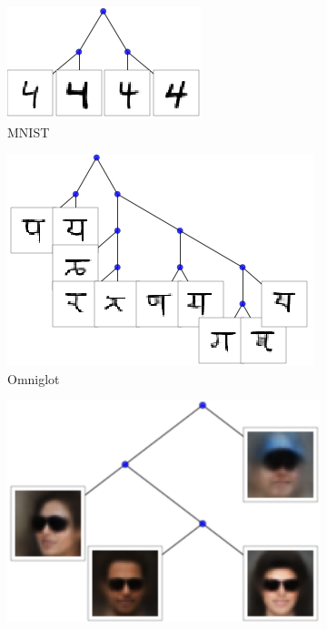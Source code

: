 \begin{figure}[t]
\centering
\begin{subfigure}[t]{0.3\textwidth}
\centering
\includegraphics[width=\textwidth]{img/loracs/mnist/subtree1.png}
\caption{MNIST}
\end{subfigure}
\begin{subfigure}[t]{0.3\textwidth}
\centering
\includegraphics[width=\textwidth]{img/loracs/omniglot/subtree1.png}
\caption{Omniglot}
\end{subfigure}
\begin{subfigure}[t]{0.3\textwidth}
\centering
\includegraphics[width=\textwidth]{img/loracs/celeba/subtree1.png}

\end{subfigure}
\end{figure}
